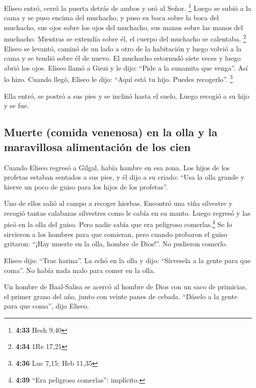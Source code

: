  Eliseo entró, cerró la puerta detrás de ambos y oró al
Señor. \footnote{\textbf{4:33} Hech 9,40}  Luego se subió
a la cama y se puso encima del muchacho, y puso su boca sobre la boca
del muchacho, sus ojos sobre los ojos del muchacho, sus manos sobre las
manos del muchacho. Mientras se extendía sobre él, el cuerpo del
muchacho se calentaba. \footnote{\textbf{4:34} 1Re 17,21}
 Eliseo se levantó, caminó de un lado a otro de la
habitación y luego volvió a la cama y se tendió sobre él de nuevo. El
muchacho estornudó siete veces y luego abrió los ojos. 
Eliseo llamó a Giezi y le dijo: ``Pide a la sunamita que venga''. Así lo
hizo. Cuando llegó, Eliseo le dijo: ``Aquí está tu hijo. Puedes
recogerlo''. \footnote{\textbf{4:36} Luc 7,15; Heb 11,35}

 Ella entró, se postró a sus pies y se inclinó hasta el
suelo. Luego recogió a su hijo y se fue.

\hypertarget{muerte-comida-venenosa-en-la-olla-y-la-maravillosa-alimentaciuxf3n-de-los-cien}{%
\subsection{Muerte (comida venenosa) en la olla y la maravillosa
alimentación de los
cien}\label{muerte-comida-venenosa-en-la-olla-y-la-maravillosa-alimentaciuxf3n-de-los-cien}}

 Cuando Eliseo regresó a Gilgal, había hambre en esa
zona. Los hijos de los profetas estaban sentados a sus pies, y él dijo a
su criado: ``Usa la olla grande y hierve un poco de guiso para los hijos
de los profetas''.

 Uno de ellos salió al campo a recoger hierbas. Encontró
una viña silvestre y recogió tantas calabazas silvestres como le cabía
en su manto. Luego regresó y las picó en la olla del guiso. Pero nadie
sabía que era peligroso comerlas.\footnote{\textbf{4:39} ``Era peligroso
  comerlas'': implícito.}  Se lo sirvieron a los hombres
para que comieran, pero cuando probaron el guiso gritaron: ``¡Hay muerte
en la olla, hombre de Dios!''. No pudieron comerlo.

 Eliseo dijo: ``Trae harina''. La echó en la olla y dijo:
``Sírvesela a la gente para que coma''. No había nada malo para comer en
la olla.

 Un hombre de Baal-Salisa se acercó al hombre de Dios con
un saco de primicias, el primer grano del año, junto con veinte panes de
cebada. ``Dáselo a la gente para que coma'', dijo Eliseo.

